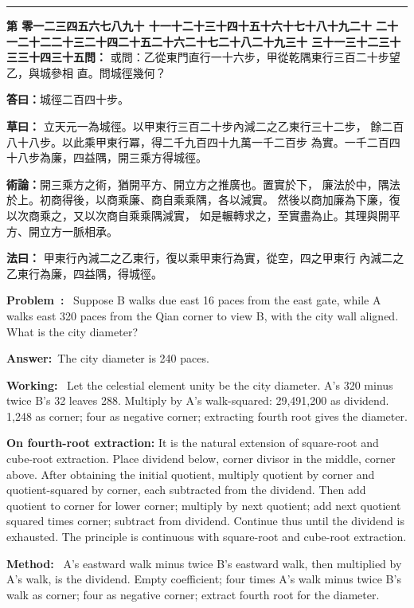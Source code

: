 \documentclass[9pt,a4paper]{article}
\newcounter{probnum}
\newcounter{overallnum}
\newcommand{\chnum}[1]{%
  \ifcase#1 零\or 一\or 二\or 三\or 四\or 五\or 六\or 七\or 八\or 九\or 十\or
    十一\or 十二\or 十三\or 十四\or 十五\or 十六\or 十七\or 十八\or 十九\or 二十\or
    二十一\or 二十二\or 二十三\or 二十四\or 二十五\or 二十六\or 二十七\or 二十八\or 二十九\or 三十\or
    三十一\or 三十二\or 三十三\or 三十四\or 三十五\fi}
\newcommand{\problem}[1]{\stepcounter{probnum}\stepcounter{overallnum}\par\noindent\textbf{\color{volcolor}第\chnum{\value{probnum}}問：}#1\par\vspace{0.15cm}}
\newcommand{\answer}[1]{\par\noindent\textbf{答曰：}#1\par\vspace{0.15cm}}
\newcommand{\working}[1]{\par\noindent\textbf{草曰：}#1\par\vspace{0.15cm}}
\newcommand{\method}[1]{\par\noindent\textbf{法曰：}#1\par\vspace{0.25cm}}
\newcommand{\eproblem}[1]{\par\noindent\textbf{\color{volcolor}Problem~\theoverallnum:}~#1\par\vspace{0.15cm}}
\newcommand{\eanswer}[1]{\par\noindent\textbf{Answer:}~#1\par\vspace{0.15cm}}
\newcommand{\eworking}[1]{\par\noindent\textbf{Working:}~#1\par\vspace{0.15cm}}
\newcommand{\emethod}[1]{\par\noindent\textbf{Method:}~#1\par\vspace{0.25cm}}
\begin{document}
\vspace{0.15cm}
\noindent\rule{\textwidth}{0.2pt}
\vspace{0.15cm}

\noindent\begin{minipage}[t]{0.48\textwidth}
\problem{
或問：乙從東門直行一十六步，甲從乾隅東行三百二十步望乙，與城參相
直。問城徑幾何？
}

\answer{城徑二百四十步。}

\working{
立天元一為城徑。以甲東行三百二十步內減二之乙東行三十二步，
餘二百八十八步。以此乘甲東行冪，得二千九百四十九萬一千二百步
為實。一千二百四十八步為廉，四益隅，開三乘方得城徑。

\textbf{術論：}開三乘方之術，猶開平方、開立方之推廣也。置實於下，
廉法於中，隅法於上。初商得後，以商乘廉、商自乘乘隅，各以減實。
然後以商加廉為下廉，復以次商乘之，又以次商自乘乘隅減實，
如是輾轉求之，至實盡為止。其理與開平方、開立方一脈相承。
}

\method{
甲東行內減二之乙東行，復以乘甲東行為實，從空，四之甲東行
內減二之乙東行為廉，四益隅，得城徑。
}
\end{minipage}%
\hfill%
\begin{minipage}[t]{0.50\textwidth}
\eproblem{
Suppose B walks due east 16 paces from the east gate, while A walks east 320
paces from the Qian corner to view B, with the city wall aligned. What is
the city diameter?
}

\eanswer{The city diameter is 240 paces.}

\eworking{
Let the celestial element unity be the city diameter. A's 320 minus twice
B's 32 leaves 288. Multiply by A's walk-squared: 29,491,200 as dividend.
1,248 as corner; four as negative corner; extracting fourth root gives the
diameter.

\textbf{On fourth-root extraction:} It is the natural extension of square-root
and cube-root extraction. Place dividend below, corner divisor in the middle,
corner above. After obtaining the initial quotient, multiply quotient by corner
and quotient-squared by corner, each subtracted from the dividend. Then add
quotient to corner for lower corner; multiply by next quotient; add next
quotient squared times corner; subtract from dividend. Continue thus until
the dividend is exhausted. The principle is continuous with square-root and
cube-root extraction.
}

\emethod{
A's eastward walk minus twice B's eastward walk, then multiplied by A's walk,
is the dividend. Empty coefficient; four times A's walk minus twice B's walk
as corner; four as negative corner; extract fourth root for the diameter.
}
\end{minipage}
\vspace{0.15cm}
\end{document}
